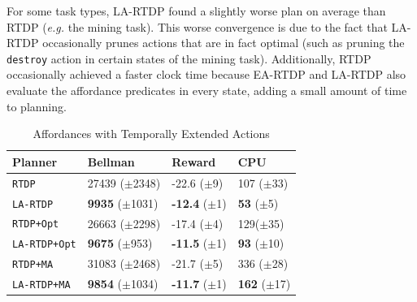 \documentclass[letterpaper]{article}
\newcommand{\stnote}[1]{\textcolor{Blue}{\textbf{stefie10: #1}}}
\newcommand{\ra}[1]{\renewcommand{\arraystretch}{#1}} %
\begin{document}
For some task types, LA-RTDP found a slightly worse plan on average than
RTDP ({\em e.g.} the mining task). This worse convergence is due to the fact that LA-RTDP
occasionally prunes actions that are in fact optimal (such as
pruning the \texttt{destroy} action in certain states of the mining task).
Additionally, RTDP occasionally achieved a faster clock time because EA-RTDP and LA-RTDP also evaluate the affordance predicates in every state, adding a small amount of time to planning.



\begin{table}[b]
\ra{1.1}
\small
\begin{tabular}{@{}llll@{}}\toprule
Planner & Bellman & Reward & CPU \\ \midrule
\texttt{RTDP}   			&	27439 ($\pm$2348)		&	-22.6 ($\pm$9)		& 107 ($\pm$33) \\
\texttt{LA-RTDP} 			& 	{\bf 9935} ($\pm$1031)	&	{\bf -12.4} ($\pm$1)& {\bf 53} ($\pm$5) \\ \hline
\texttt{RTDP+Opt}  		&	26663 ($\pm$2298)		&	-17.4 ($\pm$4) 		& 129($\pm$35) \\
\texttt{LA-RTDP+Opt} 		& 	{\bf 9675} ($\pm$953)	&	{\bf -11.5} ($\pm$1)	&{\bf 93} ($\pm$10) \\ \hline
\texttt{RTDP+MA}  		&	31083 ($\pm$2468)		&	-21.7	 ($\pm$5)		&336 ($\pm$28) \\
\texttt{LA-RTDP+MA}  		& 	{\bf 9854} ($\pm$1034)	&	{\bf -11.7} ($\pm$1)	&{\bf 162} ($\pm$17) \\ %
\bottomrule
\end{tabular}
\caption{Affordances with Temporally Extended Actions}
\label{table:temp_ext_act_results}
\end{table}


\end{document}
